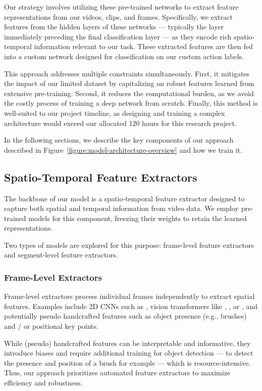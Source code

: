Our strategy involves utilizing these pre-trained networks to extract feature representations from our videos, clips, and frames. Specifically, we extract features from the hidden layers of these networks — typically the layer immediately preceding the final classification layer — as they encode rich spatio-temporal information relevant to our task. These extracted features are then fed into a custom network designed for classification on our custom action labels.

This approach addresses multiple constraints simultaneously. First, it mitigates the impact of our limited dataset by capitalizing on robust features learned from extensive pre-training. Second, it reduces the computational burden, as we avoid the costly process of training a deep network from scratch. Finally, this method is well-suited to our project timeline, as designing and training a complex architecture would exceed our allocated 120 hours for this research project.

In the following sections, we describe the key components of our approach described in Figure~\ref{figure:model-architecture-overview} and how we train it.

\subsection{Spatio-Temporal Feature Extractors}
The backbone of our model is a spatio-temporal feature extractor designed to capture both spatial and temporal information from video data. We employ pre-trained models for this component, freezing their weights to retain the learned representations.

Two types of models are explored for this purpose: frame-level feature extractors and segment-level feature extractors.

\subsubsection{Frame-Level Extractors}
Frame-level extractors process individual frames independently to extract spatial features. Examples include 2D CNNs such as , vision transformers like , , or , and potentially pseudo handcrafted features such as object presence (e.g., brushes) and / or positional key points.

While (pseudo) handcrafted features can be interpretable and informative, they introduce biases and require additional training for object detection — to detect the presence and position of a brush for example — which is resource-intensive. Thus, our approach prioritizes automated feature extractors to maximize efficiency and robustness.

